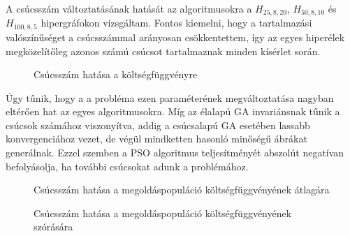 A csúcsszám változtatásának hatását az algoritmusokra a $H_{25,8,20}$, $H_{50,8,10}$ és $H_{100,8,5}$ hipergráfokon vizsgáltam. Fontos kiemelni, hogy a tartalmazási valószínűséget a csúcsszámmal arányosan csökkentettem, így az egyes hiperélek megközelítőleg azonos számú csúcsot tartalmaznak minden kísérlet során.

\begin{figure}[H]
	\centering
	\hspace{5pt}
	\hspace{5pt}
	\caption{Csúcsszám hatása a költségfüggvényre}
	\label{fig:node_size_cost}
\end{figure}

Úgy tűnik, hogy a a probléma ezen paraméterének megváltoztatása nagyban eltérően hat az egyes algoritmusokra. Míg az élalapú GA invariánsnak tűnik a csúcsok számához viszonyítva, addig a csúcsalapú GA esetében lassabb konvergenciához vezet, de végül mindketten hasonló minőségű ábrákat generálnak. Ezzel szemben a PSO algoritmus teljesítményét abszolút negatívan befolyásolja, ha további csúcsokat adunk a problémához.

\begin{figure}[H]
	\centering
	\hspace{5pt}
	\hspace{5pt}
	\caption{Csúcsszám hatása a megoldáspopuláció költségfüggvényének átlagára}
	\label{fig:node_size_cost_mean}
\end{figure}

\begin{figure}[H]
	\centering
	\hspace{5pt}
	\hspace{5pt}
	\caption{Csúcsszám hatása a megoldáspopuláció költségfüggvényének szórására}
	\label{fig:node_size_cost_std}
\end{figure}

